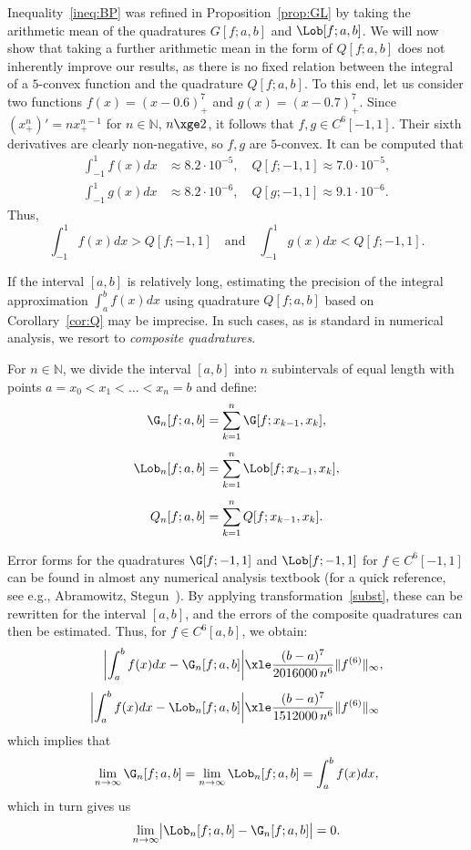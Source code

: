 \documentclass[12pt]{amsart}
\theoremstyle{definition}
\begin{document}
Inequality~\eqref{ineq:BP} was refined in Proposition~\ref{prop:GL} by taking the arithmetic mean of the quadratures $G[f;a,b]$ and $\Lob[f;a,b]$. We will now show that taking a further arithmetic mean in the form of $Q[f;a,b]$ does not inherently improve our results, as there is no fixed relation between the integral of a $5$-convex function and the quadrature $Q[f;a,b]$. To this end, let us consider two functions $f(x)=(x-0.6)^7_+$ and $g(x)=(x-0.7)^7_+$. Since $(x^n_+)' = nx^{n-1}_+$ for $n\in\mathbb{N}$, $n\xge 2$, it follows that $f,g\in C^6[-1,1]$. Their sixth derivatives are clearly non-negative, so $f,g$ are $5$-convex. It can be computed that
\begin{align*}
 \int_{-1}^1 f(x) dx &\approx 8.2\cdot 10^{-5},\quad Q[f;-1,1]\approx 7.0\cdot 10^{-5},\\[1ex]
 \int_{-1}^1 g(x) dx &\approx 8.2\cdot 10^{-6},\quad Q[g;-1,1]\approx 9.1\cdot 10^{-6}.
\end{align*}
Thus,
\[
 \int_{-1}^1 f(x) dx > Q[f;-1,1] \quad\text{and}\quad \int_{-1}^1 g(x) dx < Q[f;-1,1].
\]

If the interval $[a,b]$ is relatively long, estimating the precision of the integral approximation $\int_a^b f(x) dx$ using quadrature $Q[f;a,b]$ based on Corollary~\ref{cor:Q} may be imprecise. In such cases, as is standard in numerical analysis, we resort to \emph{composite quadratures}.

For $n\in\mathbb{N}$, we divide the interval $[a,b]$ into $n$ subintervals of equal length with points $a=x_0 < x_1 < \dots < x_n=b$ and define:
\begin{align*}
 \G_n[f;a,b] &= \sum_{k=1}^n \G[f;x_{k-1},x_k],\\[1ex]
 \Lob_n[f;a,b] &= \sum_{k=1}^n \Lob[f;x_{k-1},x_k],\\[1ex]
 Q_n[f;a,b] &= \sum_{k=1}^n Q[f;x_{k-1},x_k].
\end{align*}

Error forms for the quadratures $\G[f;-1,1]$ and $\Lob[f;-1,1]$ for $f\in C^6[-1,1]$ can be found in almost any numerical analysis textbook (for a quick reference, see e.g., Abramowitz, Stegun~\cite[pp. 887, 888]{AbrSte65}). By applying transformation~\eqref{subst}, these can be rewritten for the interval $[a,b]$, and the errors of the composite quadratures can then be estimated. Thus, for $f\in C^6[a,b]$, we obtain:
\begin{align*}
 \biggl|\int_a^b f(x) dx - \G_n[f;a,b] \biggr| &\xle \frac{(b-a)^7}{2016000\,n^6}\|f^{(6)}\|_{\infty},\\[1ex]
 \biggl|\int_a^b f(x) dx - \Lob_n[f;a,b] \biggr| &\xle \frac{(b-a)^7}{1512000\,n^6}\|f^{(6)}\|_{\infty}
\end{align*}
which implies that
\[
 \lim\limits_{n\to\infty} \G_n[f;a,b] = \lim\limits_{n\to\infty} \Lob_n[f;a,b] = \int_a^b f(x) dx,
\]
which in turn gives us
\begin{equation}\label{lim}
 \lim\limits_{n\to\infty}\bigl| \Lob_n[f;a,b] - \G_n[f;a,b] \bigr| = 0.
\end{equation}
\end{document}

